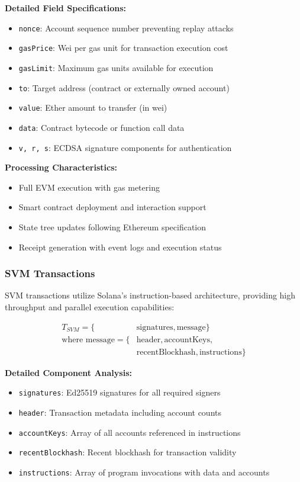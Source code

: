 \documentclass[11pt,a4paper]{article}
\begin{document}
\textbf{Detailed Field Specifications:}
\begin{itemize}
    \item \texttt{nonce}: Account sequence number preventing replay attacks
    \item \texttt{gasPrice}: Wei per gas unit for transaction execution cost
    \item \texttt{gasLimit}: Maximum gas units available for execution
    \item \texttt{to}: Target address (contract or externally owned account)
    \item \texttt{value}: Ether amount to transfer (in wei)
    \item \texttt{data}: Contract bytecode or function call data
    \item \texttt{v, r, s}: ECDSA signature components for authentication
\end{itemize}

\textbf{Processing Characteristics:}
\begin{itemize}
    \item Full EVM execution with gas metering
    \item Smart contract deployment and interaction support
    \item State tree updates following Ethereum specification
    \item Receipt generation with event logs and execution status
\end{itemize}

\subsubsection{SVM Transactions}
SVM transactions utilize Solana's instruction-based architecture, providing high throughput and parallel execution capabilities:

\begin{align}
T_{SVM} = \{&\text{signatures}, \text{message}\} \\
\text{where } \text{message} = \{&\text{header}, \text{accountKeys}, \\
                                &\text{recentBlockhash}, \text{instructions}\}
\end{align}

\textbf{Detailed Component Analysis:}
\begin{itemize}
    \item \texttt{signatures}: Ed25519 signatures for all required signers
    \item \texttt{header}: Transaction metadata including account counts
    \item \texttt{accountKeys}: Array of all accounts referenced in instructions
    \item \texttt{recentBlockhash}: Recent blockhash for transaction validity
    \item \texttt{instructions}: Array of program invocations with data and accounts
\end{itemize}
\end{document}
